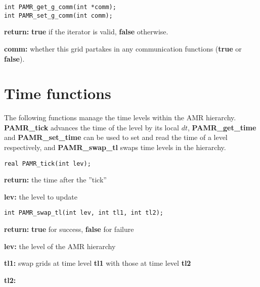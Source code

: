 \documentclass[aps,amssymb,unsortedaddress,nofootinbib]{revtex4}
\def\lsep{\itemsep 0.05in}
\begin{document}

\begin{verbatim}
int PAMR_get_g_comm(int *comm);
int PAMR_set_g_comm(int comm);
\end{verbatim}
\begin{list}{}{\lsep}
\item {\bf return:} {\bf true} if the iterator is valid, {\bf false} otherwise.
\item {\bf *comm:} whether this grid partakes in any communication functions
                   ({\bf true} or {\bf false}).
\end{list}


\section{Time functions}

The following functions manage the time levels within the AMR hierarchy.
{\bf PAMR\_tick} advances the time of the level by its local $dt$, 
{\bf PAMR\_get\_time} and {\bf PAMR\_set\_time} can be used to set and read
the time of a level respectively, and {\bf PAMR\_swap\_tl} swaps time levels 
in the hierarchy.


\begin{verbatim}
real PAMR_tick(int lev);
\end{verbatim}
\begin{list}{}{\lsep}
\item {\bf return:} the time after the ''tick''
\item {\bf lev:} the level to update
\end{list}


\begin{verbatim}
int PAMR_swap_tl(int lev, int tl1, int tl2);
\end{verbatim}
\begin{list}{}{\lsep}
\item {\bf return:} {\bf true} for success, {\bf false} for failure
\item {\bf lev:} the level of the AMR hierarchy 
\item {\bf tl1:} swap grids at time level {\bf tl1} with those at time level {\bf tl2}
\item {\bf tl2:}
\end{list}
\end{document}
